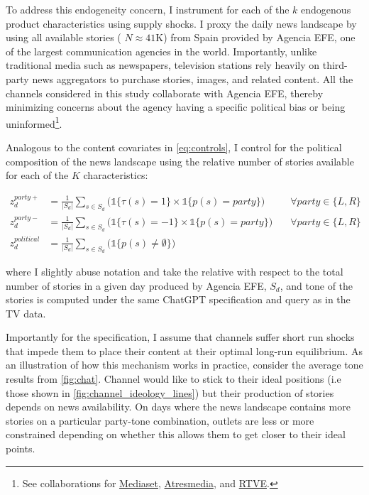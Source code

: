 \documentclass[12pt]{article}
\begin{document}
	
	
	

	
	To address this endogeneity concern, I instrument for each of the $k$ endogenous product characteristics using supply shocks. I proxy the daily news landscape by using all available stories ( $N\approx41\text{K}$) from Spain provided by Agencia EFE, one of the largest communication agencies in the world. Importantly, unlike traditional media such as newspapers, television stations rely heavily on third-party news aggregators to purchase stories, images, and related content.	All the channels considered in this study collaborate with Agencia EFE, thereby minimizing concerns about the agency having a specific political bias or being uninformed\footnote{See collaborations for \href{https://www.telecinco.es/autores/agencia-efe/}{Mediaset}, \href{https://cadenaser.com/nacional/2024/09/22/el-teletexto-una-herramienta-olvidada-que-aun-perdura-en-nuestras-televisiones-cadena-ser/}{Atresmedia}, and \href{https://www.rtve.es/rtve/20130301/rtve-agencia-efe-firman-convenio-colaboracion/611440.shtml}{RTVE}.}.
	
	
	Analogous to the content covariates in \ref{eq:controls}, I control for the political composition of the news landscape using the relative number of stories available for each of the $K$ characteristics: 
	
	
	\begin{equation}\label{eq:first_stage}
		\begin{aligned}
			z_d^{party+}&= \frac{1}{|S_d|} \sum_{s \in S_d}\bigg(\mathds{1}\{\tau(s)=1\} \times \mathds{1}\{p(s)=party\} \bigg)\quad &\forall party \in \{L,R\}\\
			z_d^{party-}&= \frac{1}{|S_d|}\sum_{s \in S_d}\bigg( \mathds{1}\{\tau(s)=-1\} \times \mathds{1}\{p(s)=party\} \bigg) \quad &\forall party \in \{L,R\}\\
			z_d^{political}&=\frac{1}{|S_d|} \sum_{s \in S_d}\bigg(  \mathds{1}\{p(s)\neq\emptyset\} \bigg)
		\end{aligned}
	\end{equation} 
	
	
where I slightly abuse notation and take the relative with respect to the total number of stories in a given day produced by Agencia EFE, $S_d$, and tone of the stories is computed under the same ChatGPT specification and query as in the TV data. 

Importantly for the specification, I assume that channels suffer short run shocks that impede them to place their content at their optimal long-run equilibrium. As an illustration of how this mechanism works in practice, consider the average tone results from \ref{fig:chat}.  
    Channel would like to stick to their ideal positions (i.e those shown in \ref{fig:channel_ideology_lines}) but their production of stories depends on news availability. On days where the news landscape contains more stories on a particular party-tone combination, outlets are less or more constrained depending on whether this allows them to get closer to their ideal points. 
\end{document}
